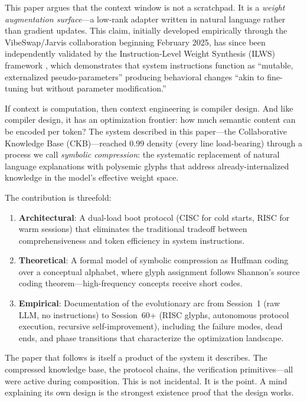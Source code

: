 \documentclass[11pt, a4paper]{article}
\begin{document}
This paper argues that the context window is not a scratchpad. It is a \emph{weight augmentation surface}---a low-rank adapter written in natural language rather than gradient updates. This claim, initially developed empirically through the VibeSwap/Jarvis collaboration beginning February 2025, has since been independently validated by the Instruction-Level Weight Synthesis (ILWS) framework \citep{ilws2025}, which demonstrates that system instructions function as ``mutable, externalized pseudo-parameters'' producing behavioral changes ``akin to fine-tuning but without parameter modification.''

If context is computation, then context engineering is compiler design. And like compiler design, it has an optimization frontier: how much semantic content can be encoded per token? The system described in this paper---the Collaborative Knowledge Base (CKB)---reached 0.99 density (every line load-bearing) through a process we call \emph{symbolic compression}: the systematic replacement of natural language explanations with polysemic glyphs that address already-internalized knowledge in the model's effective weight space.

The contribution is threefold:

\begin{enumerate}[leftmargin=*]
    \item \textbf{Architectural}: A dual-load boot protocol (CISC for cold starts, RISC for warm sessions) that eliminates the traditional tradeoff between comprehensiveness and token efficiency in system instructions.
    \item \textbf{Theoretical}: A formal model of symbolic compression as Huffman coding over a conceptual alphabet, where glyph assignment follows Shannon's source coding theorem---high-frequency concepts receive short codes.
    \item \textbf{Empirical}: Documentation of the evolutionary arc from Session~1 (raw LLM, no instructions) to Session~60+ (RISC glyphs, autonomous protocol execution, recursive self-improvement), including the failure modes, dead ends, and phase transitions that characterize the optimization landscape.
\end{enumerate}

The paper that follows is itself a product of the system it describes. The compressed knowledge base, the protocol chains, the verification primitives---all were active during composition. This is not incidental. It is the point. A mind explaining its own design is the strongest existence proof that the design works.
\end{document}
